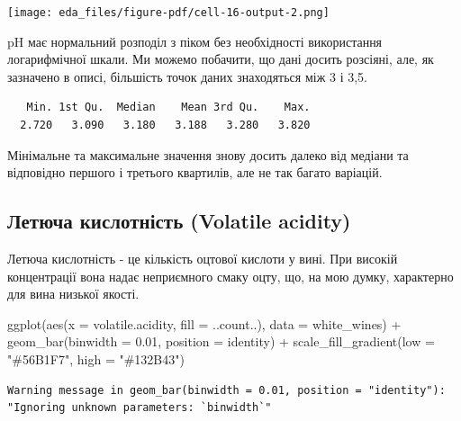 \documentclass[
  letterpaper,
  DIV=11,
  numbers=noendperiod]{scrreprt}
\newenvironment{Shaded}{\begin{snugshade}}{\end{snugshade}}
\newcommand{\AttributeTok}[1]{\textcolor[rgb]{0.40,0.45,0.13}{#1}}
\newcommand{\FloatTok}[1]{\textcolor[rgb]{0.68,0.00,0.00}{#1}}
\newcommand{\FunctionTok}[1]{\textcolor[rgb]{0.28,0.35,0.67}{#1}}
\newcommand{\NormalTok}[1]{\textcolor[rgb]{0.00,0.23,0.31}{#1}}
\newcommand{\SpecialCharTok}[1]{\textcolor[rgb]{0.37,0.37,0.37}{#1}}
\newcommand{\StringTok}[1]{\textcolor[rgb]{0.13,0.47,0.30}{#1}}
\begin{document}
\texttt{[image: eda\_files/figure-pdf/cell-16-output-2.png]}

pH має нормальний розподіл з піком без необхідності використання
логарифмічної шкали. Ми можемо побачити, що дані досить розсіяні, але,
як зазначено в описі, більшість точок даних знаходяться між 3 і 3,5.

\begin{Shaded}
\end{Shaded}

\begin{verbatim}
   Min. 1st Qu.  Median    Mean 3rd Qu.    Max. 
  2.720   3.090   3.180   3.188   3.280   3.820 
\end{verbatim}

Мінімальне та максимальне значення знову досить далеко від медіани та
відповідно першого і третього квартилів, але не так багато варіацій.

\subsection{Летюча кислотність (Volatile
acidity)}\label{ux43bux435ux442ux44eux447ux430-ux43aux438ux441ux43bux43eux442ux43dux456ux441ux442ux44c-volatile-acidity}

Летюча кислотність - це кількість оцтової кислоти у вині. При високій
концентрації вона надає неприємного смаку оцту, що, на мою думку,
характерно для вина низької якості.

\begin{Shaded}
\begin{Highlighting}[]
\FunctionTok{ggplot}\NormalTok{(}\FunctionTok{aes}\NormalTok{(}\AttributeTok{x =}\NormalTok{ volatile.acidity, }\AttributeTok{fill =}\NormalTok{ ..count..), }\AttributeTok{data =}\NormalTok{ white\_wines) }\SpecialCharTok{+}
  \FunctionTok{geom\_bar}\NormalTok{(}\AttributeTok{binwidth =} \FloatTok{0.01}\NormalTok{, }\AttributeTok{position =} \StringTok{\textquotesingle{}identity\textquotesingle{}}\NormalTok{) }\SpecialCharTok{+}
  \FunctionTok{scale\_fill\_gradient}\NormalTok{(}\AttributeTok{low =} \StringTok{"\#56B1F7"}\NormalTok{, }\AttributeTok{high =} \StringTok{"\#132B43"}\NormalTok{)}
\end{Highlighting}
\end{Shaded}

\begin{verbatim}
Warning message in geom_bar(binwidth = 0.01, position = "identity"):
"Ignoring unknown parameters: `binwidth`"
\end{verbatim}
\end{document}
